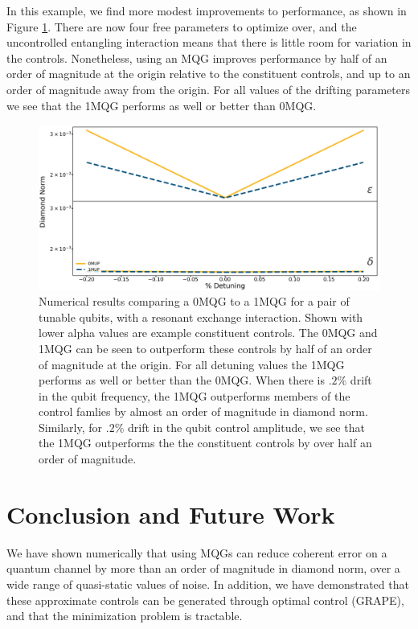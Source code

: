 \documentclass[aps,nofootinbib,pra,notitlepage,twocolumn]{revtex4-1}
\begin{document}
In this example, we find more modest improvements to performance, as shown in Figure \ref{fig:2MQG}. There are now four free parameters to optimize over, and the uncontrolled entangling interaction means that there is little room for variation in the controls. Nonetheless, using an MQG improves performance by half of an order of magnitude at the origin relative to the constituent controls, and up to an order of magnitude away from the origin. For all values of the drifting parameters we see that the 1MQG performs as well or better than 0MQG.

\begin{figure}
  \centering
  \includegraphics[width=\columnwidth]{2QRBC_no_member.png}
  \caption{Numerical results comparing a 0MQG to a 1MQG for a pair of tunable qubits, with a resonant exchange interaction. Shown with lower alpha values are example constituent controls. The 0MQG and 1MQG can be seen to outperform these controls by half of an order of magnitude at the origin. For all detuning values the 1MQG performs as well or better than the 0MQG. When there is $.2\%$ drift in the qubit frequency, the 1MQG outperforms members of the control famlies by almost an order of magnitude in diamond norm. Similarly, for $.2\%$ drift in the qubit control amplitude, we see that the 1MQG outperforms the the constituent controls by over half an order of magnitude.}
  \label{fig:2MQG}
\end{figure}








\section{Conclusion and Future Work}
We have shown numerically that using MQGs can reduce coherent error on a quantum channel by more than an order of magnitude in diamond norm, over a wide range of quasi-static values of noise. In addition, we have demonstrated that these approximate controls can be generated through optimal control (GRAPE), and that the minimization problem is tractable.
\end{document}
